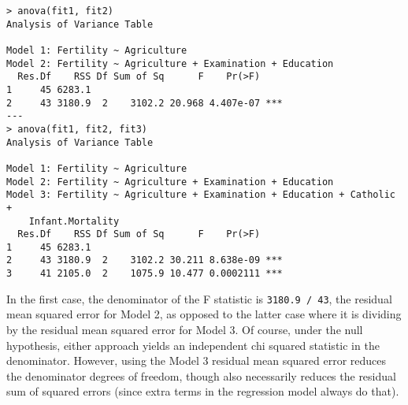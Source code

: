 \begin{verbatim}
> anova(fit1, fit2)
Analysis of Variance Table

Model 1: Fertility ~ Agriculture
Model 2: Fertility ~ Agriculture + Examination + Education
  Res.Df    RSS Df Sum of Sq      F    Pr(>F)    
1     45 6283.1                                  
2     43 3180.9  2    3102.2 20.968 4.407e-07 ***
---
> anova(fit1, fit2, fit3)
Analysis of Variance Table

Model 1: Fertility ~ Agriculture
Model 2: Fertility ~ Agriculture + Examination + Education
Model 3: Fertility ~ Agriculture + Examination + Education + Catholic + 
    Infant.Mortality
  Res.Df    RSS Df Sum of Sq      F    Pr(>F)    
1     45 6283.1                                  
2     43 3180.9  2    3102.2 30.211 8.638e-09 ***
3     41 2105.0  2    1075.9 10.477 0.0002111 ***
\end{verbatim}
In the first case, the denominator of the F statistic is 
\texttt{3180.9 / 43}, the residual mean squared error for Model 2,
as opposed to the latter case where it is dividing by the residual
mean squared error for Model 3. Of course, under the null hypothesis,
either approach yields an independent chi squared statistic in the denominator.
However, using the Model 3 residual mean squared error reduces the
denominator degrees of freedom, though also necessarily reduces the
residual sum of squared errors (since extra terms in the regression
model always do that). 




